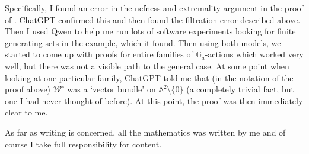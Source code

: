 \documentclass[11pt]{amsart}
\theoremstyle{plain}
\numberwithin{equation}{section}
\newcommand{\GG}{\mathbb{G}}
\renewcommand{\AA}{\mathbb{A}}
\begin{document}
Specifically, I found an error in the nefness and extremality argument in the proof of \cite[Thm.~5.1]{Maguire}.
ChatGPT confirmed this and then found the filtration error described above.
Then I used Qwen to help me run lots of software experiments looking for finite generating sets in the example, which it found.
Then using both models, we started to come up with proofs for entire families of \(\GG_a\)-actions which worked very well, but there was not a visible path to the general case.
At some point when looking at one particular family, ChatGPT told me that (in the notation of the proof above) \(\mathcal W^\circ\) was a `vector bundle' on \(\AA^2 \setminus \{0\}\) (a completely trivial fact, but one I had never thought of before).
At this point, the proof was then immediately clear to me.

As far as writing is concerned, all the mathematics was written by me and of course I take full responsibility for content.


\end{document}
